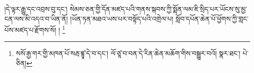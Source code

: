 །དེ་ལྟར་རྒྱུ་དང་འབྲས་བུ་དང་། སེམས་ཅན་གྱི་དོན་མཛད་པའི་གནས་སྐབས་ཀྱི་སྨོན་ལམ་ཇི་སྲིད་པར་ཡོངས་སུ་མྱ་ངན་ལས་མི་འདའ་བ་ཡིན་ནོ། །ཡོན་ཏན་མཐའ་ཡས་པར་བསྟོད་པའི་འགྲེལ་པ། སློབ་དཔོན་ཆེན་པོ་ཕྱོགས་ཀྱི་གླང་པོས་མཛད་པ་རྫོགས་སོ། ། \footnote{སསོ་རྒྱ་གར་གྱི་མཁན་པོ་སརྦ་ཛྙཱ་དེ་བ་དང་། ལོ་ཙཱ་བ་བན་དེ་རིན་ཆེན་མཆོག་གིས་བསྒྱུར་བའོ།   སྣར་ཐང་།  པེ་ཅིན། }